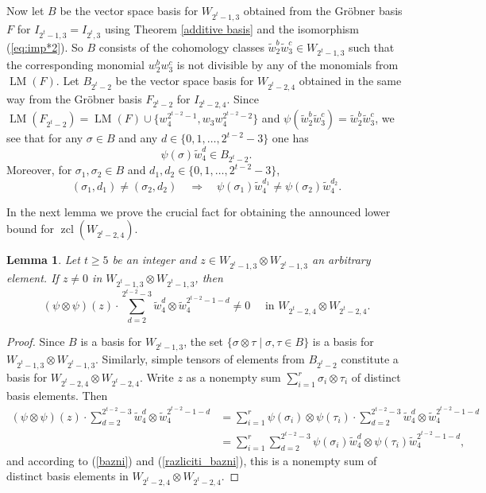 \documentclass{amsart}
\newtheorem{lemma}[theorem]{Lemma}
\theoremstyle{definition}
\theoremstyle{remark}
\numberwithin{equation}{section}
\newcommand{\w}{\widetilde w}
\newcommand{\lm}{\operatorname{LM}}
\newcommand{\zcl}{\operatorname{zcl}}
\renewcommand{\ge}{\geqslant}
\begin{document}
Now let $B$ be the vector space basis for $W_{2^t-1,3}$ obtained from the Gr\"obner basis $F$ for $I_{2^t-1,3}=I_{2^t,3}$ using Theorem \ref{additive basis} and the isomorphism (\ref{eq:imp*2}). So $B$ consists of the cohomology classes $\w_2^b\w_3^c\in W_{2^t-1,3}$ such that the corresponding monomial $w_2^bw_3^c$ is not divisible by any of the monomials from $\lm(F)$. Let $B_{2^t-2}$ be the vector space basis for $W_{2^t-2,4}$ obtained in the same way from the Gr\"obner basis $F_{2^t-2}$ for $I_{2^t-2,4}$. Since $\lm(F_{2^t-2})=\lm(F)\cup\big\{w_4^{2^{t-2}-1},w_3w_4^{2^{t-2}-2}\big\}$ and $\psi(\w_2^b\w_3^c)=\w_2^b\w_3^c$, we see that for any $\sigma\in B$ and any $d\in\{0,1,\ldots,2^{t-2}-3\}$ one has 
\begin{equation}\label{bazni}
\psi(\sigma)\w_4^d\in B_{2^t-2}.
\end{equation}
Moreover, for $\sigma_1,\sigma_2\in B$ and $d_1,d_2\in\{0,1,\ldots,2^{t-2}-3\}$,
\begin{equation}\label{razliciti_bazni}
    (\sigma_1,d_1)\ne(\sigma_2,d_2) \quad \Longrightarrow \quad \psi(\sigma_1)\w_4^{d_1}\ne\psi(\sigma_2)\w_4^{d_2}.
\end{equation}

In the next lemma we prove the crucial fact for obtaining the announced lower bound for $\zcl(W_{2^t-2,4})$.
\begin{lemma}\label{psi_tenzor_psi}
  Let $t\ge5$ be an integer and $z\in W_{2^t-1,3}\otimes W_{2^t-1,3}$ an arbitrary element. If $z\ne0$ in $W_{2^t-1,3}\otimes W_{2^t-1,3}$, then 
  \[(\psi\otimes\psi)(z)\cdot\sum_{d=2}^{2^{t-2}-3}\w_4^d\otimes\w_4^{2^{t-2}-1-d}\ne0 \quad \mbox{ in } W_{2^t-2,4}\otimes W_{2^t-2,4}.\]
\end{lemma}
\begin{proof}
    Since $B$ is a basis for $W_{2^t-1,3}$, the set $\{\sigma\otimes\tau\mid\sigma,\tau\in B\}$ is a basis for $W_{2^t-1,3}\otimes W_{2^t-1,3}$. Similarly, simple tensors of elements from $B_{2^t-2}$ constitute a basis for $W_{2^t-2,4}\otimes W_{2^t-2,4}$. Write $z$ as a nonempty sum $\sum_{i=1}^r\sigma_i\otimes\tau_i$ of distinct basis elements. Then
    \begin{align*}
      (\psi\otimes\psi)(z)\cdot\sum_{d=2}^{2^{t-2}-3}\w_4^d\otimes\w_4^{2^{t-2}-1-d}&=\sum_{i=1}^r\psi(\sigma_i)\otimes\psi(\tau_i)\cdot\sum_{d=2}^{2^{t-2}-3}\w_4^d\otimes\w_4^{2^{t-2}-1-d}\\
      &=\sum_{i=1}^r\sum_{d=2}^{2^{t-2}-3}\psi(\sigma_i)\w_4^d\otimes\psi(\tau_i)\w_4^{2^{t-2}-1-d},
    \end{align*}
    and according to (\ref{bazni}) and (\ref{razliciti_bazni}), this is a nonempty sum of distinct basis elements in $W_{2^t-2,4}\otimes W_{2^t-2,4}$. 
\end{proof}
\end{document}
